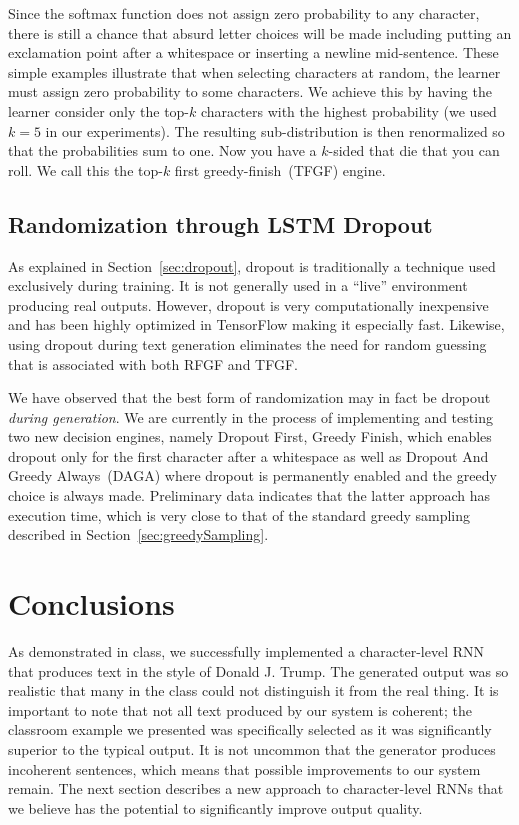 \documentclass{article}
\begin{document}
Since the softmax function does not assign zero probability to any character, there is still a chance that absurd letter choices will be made including putting an exclamation point after a whitespace or inserting a newline mid-sentence.  These simple examples illustrate that when selecting characters at random, the learner must assign zero probability to some characters. We achieve this by having the learner consider only the top-$k$ characters with the highest probability (we used $k=5$ in our experiments). The resulting sub-distribution is then renormalized so that the probabilities sum to one. Now you have a $k$-sided that die that you can roll. We call this the top-$k$ first greedy-finish~(TFGF) engine.


\subsection{Randomization through LSTM Dropout}

As explained in Section~\ref{sec:dropout}, dropout is traditionally a technique used exclusively during training.  It is not generally used in a ``live'' environment producing real outputs.  However, dropout is very computationally inexpensive and has been highly optimized in TensorFlow making it especially fast.  Likewise, using dropout during text generation eliminates the need for random guessing that is associated with both RFGF and TFGF.

We have observed that the best form of randomization may in fact be dropout \textit{during generation}.  We are currently in the process of implementing and testing two new decision engines, namely Dropout First, Greedy Finish, which enables dropout only for the first character after a whitespace as well as Dropout And Greedy Always~(DAGA) where dropout is permanently enabled and the greedy choice is always made.  Preliminary data indicates that the latter approach has execution time, which is very close to that of the standard greedy sampling described in Section~\ref{sec:greedySampling}.

\section{Conclusions}

As demonstrated in class, we successfully implemented a character-level RNN that produces text in the style of Donald J. Trump.  The generated output was so realistic that many in the class could not distinguish it from the real thing.  It is important to note that not all text produced by our system is coherent; the classroom example we presented was specifically selected as it was significantly superior to the typical output.  It is not uncommon that the generator produces incoherent sentences, which means that possible improvements to our system remain.  The next section describes a new approach to character-level RNNs that we believe has the potential to significantly improve output quality.
\end{document}
